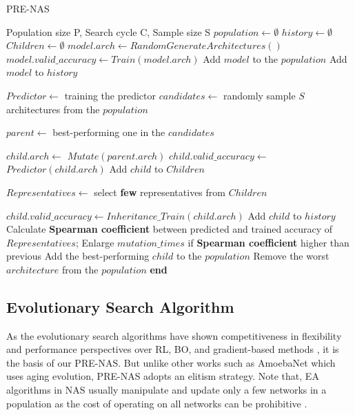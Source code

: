 \documentclass[sigconf]{acmart}
\begin{document}
\begin{algorithm}[!t]
\caption{PRE-NAS}
\label{algo}
\begin{algorithmic}[1]
\REQUIRE Population size P, Search cycle C, Sample size S
\STATE $\mathit{population} \gets \emptyset$
\STATE $\mathit{history} \gets \emptyset$
\STATE $\mathit{Children} \gets \emptyset$
\STATE $\mathit{model.arch} \gets RandomGenerateArchitectures()$ 
\STATE $\mathit{model.valid\_accuracy} \gets Train(model.arch)$ 
\STATE Add $model$ to the $population$
\STATE Add $model$ to $history$
\ENDWHILE

\STATE $\mathit{Predictor}\gets$ training the predictor
\STATE $\mathit{candidates}\gets$ randomly sample $S$ architectures from the $population$

\STATE $\mathit{parent} \gets$ best-performing one in the $candidates$  

\STATE $\mathit{child.arch} \gets$ $Mutate(parent.arch)$
\STATE $\mathit{child.valid\_accuracy} \gets$ $Predictor(child.arch)$
\STATE Add $child$ to $Children$
\ENDWHILE

\STATE $\mathit{Representatives} \gets$ select \textbf{few} representatives from $Children$

\STATE $\mathit{child.valid\_accuracy} \gets Inheritance\_Train(child.arch)$
\STATE Add $child$ to $history$
\ENDFOR
\STATE Calculate \textbf{Spearman coefficient} between predicted and trained accuracy of  $\mathit{Representatives}$;
\STATE Enlarge $mutation\_times$ if \textbf{Spearman coefficient} higher than previous
\STATE Add the best-performing $child$ to the $population$
\STATE Remove the worst $architecture$ from the $population$
\ENDWHILE
\STATE \textbf{end}
\end{algorithmic}
\end{algorithm}


\subsection{Evolutionary Search Algorithm}

As the evolutionary search algorithms \cite{Ref:07,Ref:08,Ref:27, Ref:36,Ref:37,Ref:60,Ref:62} have shown competitiveness in flexibility and performance perspectives over RL, BO, and gradient-based methods \cite{Ref:01,Ref:26,Ref:31,Ref:10}, it is the basis of our PRE-NAS. But unlike other works such as AmoebaNet \citep{Ref:08} which uses aging evolution, PRE-NAS adopts an elitism strategy. Note that, EA algorithms in NAS usually manipulate and update only a few networks in a population as the cost of operating on all networks can be prohibitive \cite{Ref:54}.
\end{document}
